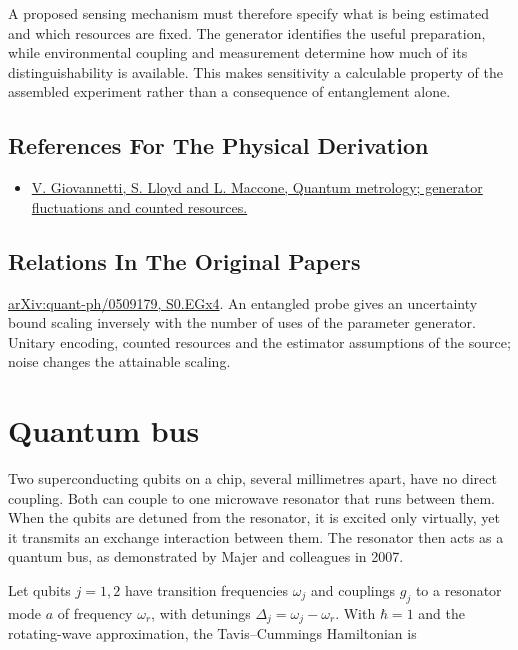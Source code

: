 \documentclass[11pt,oneside]{book}
\begin{document}
A proposed sensing mechanism must therefore specify what is being estimated and which resources are fixed. The generator identifies the useful preparation, while environmental coupling and measurement determine how much of its distinguishability is available. This makes sensitivity a calculable property of the assembled experiment rather than a consequence of entanglement alone.

\subsection*{References For The Physical Derivation}
\begin{itemize}
\item \href{https://arxiv.org/abs/quant-ph/0509179}{V. Giovannetti, S. Lloyd and L. Maccone, Quantum metrology; generator fluctuations and counted resources.}
\end{itemize}

\subsection*{Relations In The Original Papers}

\href{https://arxiv.org/html/quant-ph/0509179#S0.EGx4}{arXiv:quant-ph/0509179, S0.EGx4}. An entangled probe gives an uncertainty bound scaling inversely with the number of uses of the parameter generator. Unitary encoding, counted resources and the estimator assumptions of the source; noise changes the attainable scaling.



\clearpage

\section{Quantum bus}

\label{topic:quantum-bus}

Two superconducting qubits on a chip, several millimetres apart, have no direct coupling. Both can couple to one microwave resonator that runs between them. When the qubits are detuned from the resonator, it is excited only virtually, yet it transmits an exchange interaction between them. The resonator then acts as a quantum bus, as demonstrated by Majer and colleagues in 2007.

Let qubits \(j=1,2\) have transition frequencies \(\omega_j\) and couplings \(g_j\) to a resonator mode \(a\) of frequency \(\omega_r\), with detunings \(\Delta_j=\omega_j-\omega_r\). With \(\hbar=1\) and the rotating-wave approximation, the Tavis--Cummings Hamiltonian is
\end{document}
